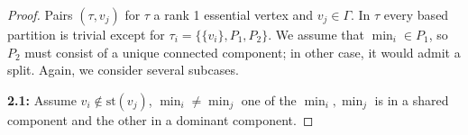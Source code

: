 \documentclass[10pt,a4paper]{amsart}
\newcommand{\B}{\mathcal{B}}
\newcommand{\G}{\Gamma}
\newcommand{\st}{\mathrm{st}}
\begin{document}
\begin{proof}



            
            
         
 


\noindent %


 Pairs $(\tau,v_j)$ for $\tau$ a rank 1 essential vertex and $v_j\in\G$. In $\tau$ every based partition is trivial except for  $\tau_i=\{\{v_i\},P_1,P_2\}$. We  assume that   $\min_i\in P_1$, so $P_2$ must consist of a unique connected component; in other case, it would admit a split. Again, we consider several subcases. 

{\textbf{2.1:}}  Assume $v_i\notin \st (v_j)$,  $\min_i\neq\min_j$ one of the $\min_i,\min_j$ is in a shared component and the other in a dominant component.


\end{proof}
\end{document}
